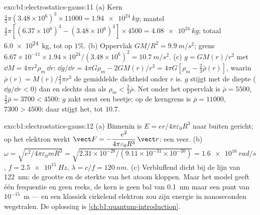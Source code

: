 \begin{solution}{exo:b1:electrostatics-gauss:11}
(a) Kern $\tfrac43\pi(3.48 \times 10^6)^3 \times 11000 = \qty{1.94e24}{kg}$; mantel
$\tfrac43\pi[(6.37 \times 10^6)^3 - (3.48 \times 10^6)^3] \times 4500 = \qty{4.08e24}{kg}$;
totaal \qty{6.0e24}{kg}, tot op $1\%$. (b) Oppervlak $GM/R^2 = \qty{9.9}{m/s^2}$;
grens $6.67 \times 10^{-11} \times 1.94 \times 10^{24}/(3.48 \times 10^6)^2 =
\qty{10.7}{m/s^2}$. (c) $g = GM(r)/r^2$ met $\dd M = 4\pi r^2\rho_m\,\dd r$:
$\dd g/\dd r = 4\pi G\rho_m - 2GM(r)/r^3 = 4\pi G[\rho_m - \tfrac23\bar\rho(r)]$,
waarin $\bar\rho(r) = M(r)/\tfrac43\pi r^3$ de gemiddelde dichtheid onder $r$ is.
$g$ stijgt met de diepte ($\dd g/\dd r < 0$) dan en slechts dan als $\rho_m < \tfrac23\bar\rho$. Net
onder het oppervlak is $\bar\rho = 5500$, $\tfrac23\bar\rho = 3700 < 4500$: $g$
zakt eerst een beetje; op de kerngrens is $\bar\rho = 11000$, $7300 >
4500$: daar stijgt het, tot $10.7$.
\end{solution}

\begin{solution}{exo:b1:electrostatics-gauss:12}
(a) Binnenin is $E = er/4\pi\varepsilon_0R^3$ naar buiten gericht; op het elektron werkt $\vect F =
-\dfrac{e^2}{4\pi\varepsilon_0R^3}\,\vect r$: een veer. (b) $\omega = \sqrt{e^2/4\pi\varepsilon_0mR^3}
= \sqrt{2.31 \times 10^{-28}/(9.11 \times 10^{-31} \times 10^{-30})} = \qty{1.6e16}{rad/s}$,
$f = \qty{2.5e15}{Hz}$, $\lambda = c/f = \qty{120}{nm}$. (c) Verbluffend dicht
bij de lijn van \qty{122}{nm}: de grootte en de sterkte van het atoom kloppen.
Maar het model geeft één frequentie en geen reeks, de kern is
geen bal van \qty{0.1}{nm} maar een punt van $10^{-15}$~m --- en een klassiek
cirkelend elektron zou zijn energie in nanoseconden wegstralen. De
oplossing is \cref{ch:b1:quantum-introduction}.
\end{solution}

